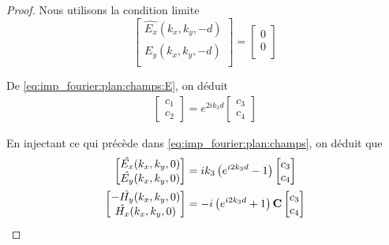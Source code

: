         \begin{proof}
            Nous utilisons la condition limite 
            \begin{equation}
                \begin{bmatrix}
                    \hat{E_x}(k_x,k_y,-d)\\
                    \hat{E_y}(k_x,k_y,-d)\\
                \end{bmatrix}
                =
                \begin{bmatrix}
                    0\\
                    0\\
                \end{bmatrix}
            \end{equation}

            De \eqref{eq:imp_fourier:plan:champs:E}, on déduit
            \begin{align}
                \begin{bmatrix}
                    c_1 \\
                    c_2
                \end{bmatrix}
                = e^{2ik_3 d}
                \begin{bmatrix}
                    c_3 \\
                    c_4
                \end{bmatrix}
            \end{align}

            En injectant ce qui précède dans \eqref{eq:imp_fourier:plan:champs}, on déduit que
            \begin{align}
                \begin{bmatrix}
                    \hat{E_x}(k_x,k_y,0)\\
                    \hat{E_y}(k_x,k_y,0)\\
                \end{bmatrix}
                &=ik_3\left( e^{i2k_3 d} -1 \right)
                \begin{bmatrix}
                    c_3 \\
                    c_4
                \end{bmatrix} \\
                \begin{bmatrix}
                    -\hat{H_y}(k_x,k_y,0)\\
                    \hat{H_x}(k_x,k_y,0)\\
                \end{bmatrix}
                & = - i\left(e^{i2k_3 d} +1 \right)
                \mathbf{C}
                \begin{bmatrix}
                c_3 \\
                c_4
                \end{bmatrix}
            \end{align}


\end{proof}
